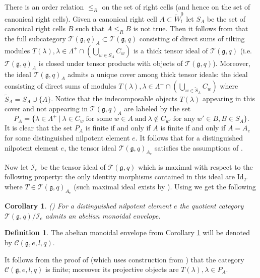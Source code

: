 \documentclass{amsart}
\newtheorem{corollary}[theorem]{Corollary}
\theoremstyle{definition}
\newtheorem{definition}[theorem]{Definition}
\newcommand{\C}{\mathcal{C}}
\newcommand{\g}{\mathfrak{g}}
\newcommand{\T}{\mathcal{T}}
\newcommand{\cI}{\mathcal{I}}
\newcommand{\Id}{\text{Id}}
\numberwithin{equation}{section}
\begin{document}
There is an order relation $\le_R$ on the set of right cells (and hence on the set of canonical right cells).
Given a canonical right cell $A\subset \tilde W_l^0$ let $S_A$ be the set of canonical right cells $B$
such that $A\le_RB$ is not true. Then it follows from \cite[Main Theorem]{Ost1} that the full subcategory
$\T(\g,q)_A\subset \T(\g,q)$ consisting of direct sums of tilting modules
$T(\lambda), \lambda \in \Lambda^+\cap \left(\bigcup_{w\in S_A}C_w\right)$ is a thick tensor ideal
of $\T(\g,q)$ (i.e. $\T(\g,q)_A$ is closed under tensor products  with objects of $\T(\g,q)$). Moreover,
the ideal $\T(\g,q)_A$ admits a unique cover among thick tensor ideals: the ideal consisting of
direct sums of modules 
$T(\lambda), \lambda \in \Lambda^+\cap \left(\bigcup_{w\in \tilde S_A}C_w\right)$ where
$\tilde S_A=S_A\cup \{A\}$. Notice that the indecomposable objects $T(\lambda)$ appearing in this cover
and not appearing in $\T(\g,q)_A$ are labeled by the set 
$$P_A=\{ \lambda \in \Lambda^+\: |\: \lambda \in C_w\;
\mbox{for some}\; w\in A\; \mbox{and}\: \lambda \not \in C_{w'}\; \mbox{for any}\; w'\in B, B\in S_A\}.$$
It is clear that the set $P_A$ is finite if and only if $A$ is finite if and only if $A=A_e$ for some
distinguished nilpotent element $e$. It follows that for a distinguished nilpotent element $e$,
the tensor ideal $\T(\g,q)_{A_e}$ satisfies the assumptions of \cite[Theorem 2.4.1(2)]{CEO}.  

Now let $\cI_e$ be the tensor ideal of $\T(\g,q)$ which is maximal with respect to the following property:
the only identity morphisms contained in this ideal are $\Id_T$ where $T\in \T(\g,q)_{A_e}$ (such maximal ideal
exists by \cite[2.3.1]{CEO}). Using \cite[Theorem 2.4.1(2)]{CEO} we get the following

\begin{corollary}\label{abenv} {\em (}\cite[Theorem 5.4.1]{CEO}\em{)} 
For a distinguished nilpotent element $e$ the quotient category $\T(\g,q)/\cI_e$
admits an abelian monoidal envelope. 
\end{corollary}

\begin{definition} The abelian monoidal envelope from Corollary \ref{abenv} will be denoted by
$\C(\g,e,l,q)$. 
\end{definition}

It follows from the proof of \cite[Theorem 2.4.1(2)]{CEO} (which uses construction from \cite{BEO}) 
that the category $\C(\g,e,l,q)$ is finite; moreover its projective objects are $T(\lambda), \lambda \in P_A$.
\end{document}
